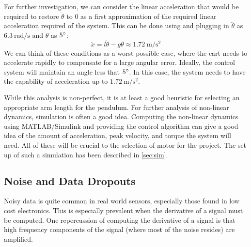 For further investigation, we can consider the linear acceleration that would be required to restore $\ddot{\theta}$ to 0 as a first approximation of the required linear acceleration required of the system. This can be done using  and plugging in $\ddot{\theta}$ as $6.3 \ \mathrm{rad/s}$ and $\theta$ as $5\degree$:
$$\ddot{x}=l\ddot\theta-g\theta\approx1.72 \ \mathrm{m/s^2}$$
We can think of these conditions as a worst possible case, where the cart needs to accelerate rapidly to compensate for a large angular error. Ideally, the control system will maintain an angle less that $5\degree$. In this case, the system needs to have the capability of acceleration up to $1.72 \ \mathrm{m/s^2}$.

While this analysis is non-perfect, it is at least a good heuristic for selecting an appropriate arm length for the pendulum. For further analysis of non-linear dynamics, simulation is often a good idea. Computing the non-linear dynamics using MATLAB/Simulink and providing the control algorithm can give a good idea of the amount of acceleration, peak velocity, and torque the system will need. All of these will be crucial to the selection of motor for the project. The set up of such a simulation has been described in \autoref{sec:sim}.
\subsection{Noise and Data Dropouts}
Noisy data is quite common in real world sensors, especially those found in low cost electronics. This is especially prevalent when the derivative of a signal must be computed. One repercussion of computing the derivative of a signal is that high frequency components of the signal (where most of the noise resides) are amplified. 

